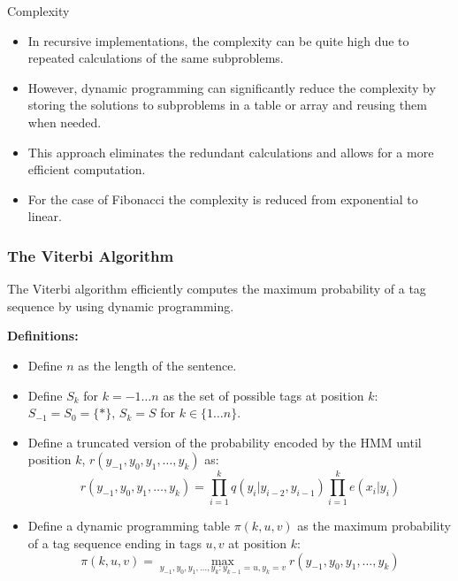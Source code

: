 \documentclass[handout]{beamer}
\begin{document}
\begin{frame}{Complexity}
\scriptsize

  \begin{itemize}
  
  \item In recursive implementations, the complexity can be quite high due to repeated calculations of the same subproblems. 
  \item However, dynamic programming can significantly reduce the complexity by storing the solutions to subproblems in a table or array and reusing them when needed. 
  \item This approach eliminates the redundant calculations and allows for a more efficient computation.
  \item For the case of Fibonacci the complexity is reduced from exponential to linear. 
  \end{itemize}

\end{frame}



\begin{frame}
  \frametitle{The Viterbi Algorithm}
  \scriptsize
  The Viterbi algorithm efficiently computes the maximum probability of a tag sequence by using dynamic programming.

  \textbf{Definitions:}
  \begin{itemize}
    \item Define $n$ as the length of the sentence.
    \item Define $S_k$ for $k = -1 \ldots n$ as the set of possible tags at position $k$: $S_{-1} = S_0 = \{*\}$, $S_k = S$ for $k \in \{1 \ldots n\}$.
\item Define a truncated version of the probability encoded by the HMM until position $k$, $r(y_{-1}, y_0, y_1, \ldots, y_k)$ as:
  \[
    r(y_{-1}, y_0, y_1, \ldots, y_k) = \prod_{i=1}^{k} q(y_i | y_{i-2}, y_{i-1})\prod_{i=1}^{k} e(x_i | y_i)
  \]
  
  \item Define a dynamic programming table $\pi(k, u, v)$ as the maximum probability of a tag sequence ending in tags $u, v$ at position $k$:
  \[
    \pi(k, u, v) = \max_{y_{-1}, y_0, y_1, \ldots, y_k : y_{k-1} = u, y_k = v} r(y_{-1}, y_0, y_1, \ldots, y_k)
  \]
  \end{itemize}
\end{frame}
\end{document}
